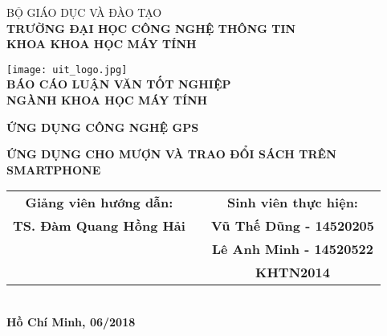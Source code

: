 \documentclass[../thesis.tex]{subfiles}
\begin{document}
\begin{titlepage}

\begin{center}

BỘ GIÁO DỤC VÀ ĐÀO TẠO\\
\textbf{TRƯỜNG ĐẠI HỌC CÔNG NGHỆ THÔNG TIN\\}
\textbf{KHOA KHOA HỌC MÁY TÍNH\\[1cm]}

\texttt{[image: uit\_logo.jpg]}\\[1cm]

\textbf{BÁO CÁO LUẬN VĂN TỐT NGHIỆP\\}
\textbf{NGÀNH KHOA HỌC MÁY TÍNH\\[2cm]}

\begin{large}
\textbf{ỨNG DỤNG CÔNG NGHỆ GPS\\[0.5cm]}
\end{large}
\textbf{{\LARGE ỨNG DỤNG CHO MƯỢN VÀ TRAO ĐỔI SÁCH TRÊN SMARTPHONE}}
\\[2cm]

\begin{tabular}{ c c r l }
 \textbf{Giảng viên hướng dẫn:} & & \multicolumn{2}{c}{\textbf{Sinh viên thực hiện:}}\\
 \textbf{TS. Đàm Quang Hồng Hải} & &\multicolumn{2}{c}{\textbf{Vũ Thế Dũng - 14520205}}\\
 & & \multicolumn{2}{c}{\textbf{Lê Anh Minh - 14520522}}\\
 & & \multicolumn{2}{c}{\textbf{KHTN2014}}
\end{tabular}
\\[4cm]

\textbf{Hồ Chí Minh, 06/2018}

\end{center}

\end{titlepage}
\end{document}
